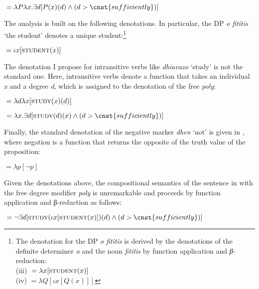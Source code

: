 \documentclass[output=paper]{langscibook}
\begin{document}
\begin{exe}
\ex\label{gia:ex35}
${}= \lambda P\lambda x.\exists d [P (x) (d) \wedge (d > \cnst{sufficiently})]$
\end{exe}

\noindent The analysis is built on the following denotations. In particular, the DP \textit{o fititis} ‘the student’ denotes a unique student:\footnote{The denotation for the DP \textit{o fititis} is derived by the denotations of the definite determiner \textit{o} and the noun \textit{fititis} by function application and \textit{β}-reduction:\\
(iii) ${}= \lambda x[\textsc{student}(x)]$\\ 
(iv) ${}= \lambda Q[\iota x [Q(x)]]$
}

\begin{exe}
\ex\label{gia:ex36}
${}= \iota x [\textsc{student}(x)]$
\end{exe}

\noindent The denotation I propose for intransitive verbs like \textit{dhiavazo} ‘study’ is not the standard one. Here, intransitive verbs denote a function that takes an individual \textit{x} and a degree \textit{d}, which is assigned to the denotation of the free \textit{poly}:

\begin{exe}
\ex\label{gia:ex37}
${}= \lambda d\lambda x[\textsc{study}(x)(d)]$

\ex\label{gia:ex38}
${}= \lambda x.\exists d[\textsc{study}(d)(x) \wedge (d > \cnst{sufficiently})]$
\end{exe}

\noindent Finally, the standard denotation of the negative marker \textit{dhen} ‘not’ is given in , where negation is a function that returns the opposite of the truth value of the proposition:

\begin{exe}
\ex\label{gia:ex39}
${}= \lambda p [\neg p]$
\end{exe}

\noindent Given the denotations above, the compositional semantics of the sentence in  with the free degree modifier \textit{poly} is unremarkable and proceeds by function application and β-reduction as follows:

\begin{exe}
\ex\label{gia:ex40}
${}= \neg \exists d[\textsc{study}(\iota x [\textsc{student}(x)]) (d) \wedge (d > \cnst{sufficiently})]$
\end{exe}
\end{document}
